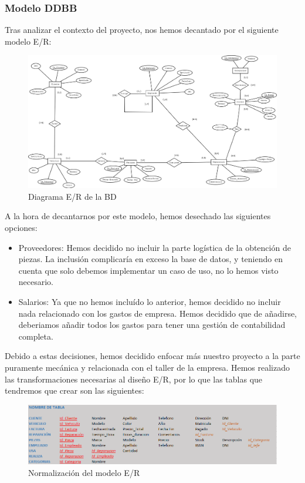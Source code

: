 \documentclass{article}
\begin{document}
\subsubsection{Modelo DDBB}
Tras analizar el contexto del proyecto, nos hemos decantado por el siguiente modelo E/R: 
\begin{figure}[H]
  \centering
  \includegraphics[width=1.0\textwidth]{bbdd/DiagramaEntidadRelacion.png}
  \caption{Diagrama E/R de la BD}
  \label{fig:ER}
\end{figure}
A la hora de decantarnos por este modelo, hemos desechado las siguientes opciones:\\
\begin{itemize}
  \item Proveedores: Hemos decidido no incluir la parte logística de la obtención de piezas. La inclusión complicaría en exceso la base de datos, y teniendo en cuenta que solo debemos implementar un caso de uso, no lo hemos visto necesario.
  \item Salarios: Ya que no hemos incluído lo anterior, hemos decidido no incluir nada relacionado con los gastos de empresa. Hemos decidido que de añadirse, deberiamos añadir todos los gastos para tener una gestión de contabilidad completa.
\end{itemize}
Debido a estas decisiones, hemos decidido enfocar más nuestro proyecto a la parte puramente mecánica y relacionada con el taller de la empresa. Hemos realizado las transformaciones necesarias al diseño E/R, por lo que las 
tablas que tendremos que crear son las siguientes:
\begin{figure}[H]
  \centering
  \includegraphics[width=1.0\textwidth]{bbdd/normalizacion.PNG}
  \caption{Normalización del modelo E/R}
\end{figure}
\end{document}

